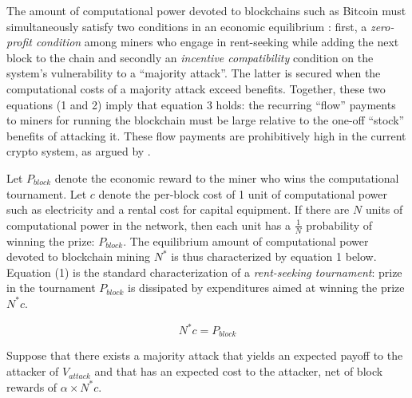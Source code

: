 \documentclass[12pt]{article}
\newcommand{\1}{\mathbbm 1}
\begin{document}
		The amount of computational power devoted to blockchains
		such as Bitcoin must simultaneously satisfy two conditions in an economic equilibrium \cite{budish2018economic}: first, a \textit{zero-profit condition} among miners who engage in rent-seeking while adding the next block to the chain and secondly an \textit{incentive compatibility} condition on the system's vulnerability to a ``majority attack''. The latter is secured when the computational costs of a majority attack exceed benefits. Together, these two equations (1 and 2) imply that equation 3 holds: the recurring ``flow'' payments to miners for running the blockchain must be large relative to the one-off ``stock'' benefits of attacking it. These flow payments are prohibitively high in the current crypto system, as argued by \cite{budish2018economic}.
		
		
		
	
		
		Let $P_{block}$ denote the economic reward to the miner who wins the computational
		tournament. Let $c$ denote the per-block cost of 1 unit of computational power such as electricity and a rental cost for capital equipment. If there are $N$ units of computational power in the network, then each unit has a $\frac{1}{N}$ probability of winning the prize: $P_{block}$. The equilibrium amount of computational power devoted to blockchain mining $N^{*}$ is thus characterized by equation 1 below. Equation (1) is the standard characterization of a \textit{rent-seeking tournament}: prize in the tournament $P_{block}$ is dissipated by expenditures aimed at winning the prize $N^{*} c$.
		
		
		
		
		
		
		
		\begin{equation}
			N^{*}c = P_{block}
		\end{equation}
	
	
	Suppose that there exists a majority attack that yields an expected
	payoff to the attacker of $V_{attack}$ and that has an expected cost to the attacker, net of block rewards of $\alpha \times N^{*} c$.
	
	
	
\end{document}
